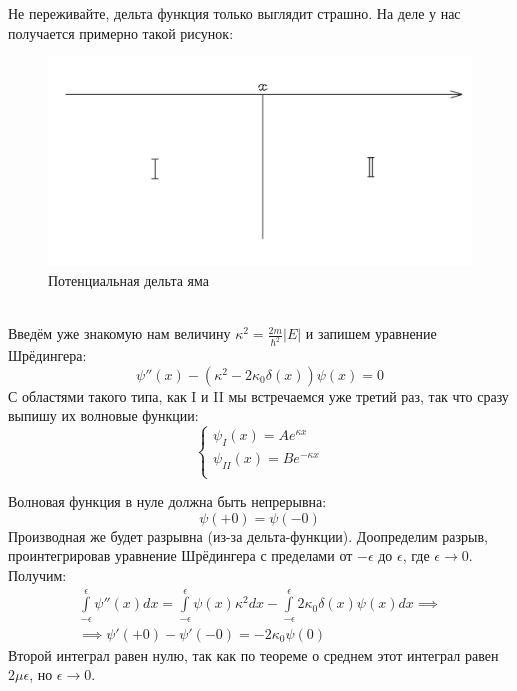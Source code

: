 Не переживайте, дельта функция только выглядит страшно. На деле у нас получается примерно такой рисунок:
\begin{figure}[!ht]
\centering
\includegraphics[scale=0.26]{class_4/images/delta hole.png}
\caption{Потенциальная дельта яма}
\label{fig 4.2}
\end{figure}\\
Введём уже знакомую нам величину $\kappa^2 = \frac{2m}{\hbar^2}|E|$ и запишем уравнение Шрёдингера:
\[
\psi''(x) - (\kappa^2 - 2\kappa_0\delta(x))\psi(x) = 0
\]
С областями такого типа, как I и II мы встречаемся уже третий раз, так что сразу выпишу их волновые функции:
\[
\begin{cases}
    \psi_I(x) = Ae^{\kappa x}\\
    \psi_{II}(x) = Be^{-\kappa x}\\
\end{cases}
\]

Волновая функция в нуле должна быть непрерывна: 
\begin{equation}
\psi(+0) = \psi(-0)    
\end{equation}
Производная же будет разрывна (из-за дельта-функции). Доопределим разрыв, проинтегрировав уравнение Шрёдингера с пределами от $-\epsilon$ до $\epsilon$, где $\epsilon \rightarrow 0$. Получим:
\begin{gather*}
\int\limits_{-\epsilon}^{\epsilon}\psi''(x)dx = \int\limits_{-\epsilon}^{\epsilon}\psi(x)\kappa^2 dx - \int\limits_{-\epsilon}^{\epsilon}2\kappa_0\delta(x)\psi(x) dx \implies\\
\implies \psi'(+0) - \psi'(-0) = -2\kappa_0\psi(0)    
\end{gather*}
Второй интеграл равен нулю, так как по теореме о среднем этот интеграл равен $2\mu\epsilon$, но $\epsilon \rightarrow 0$.

